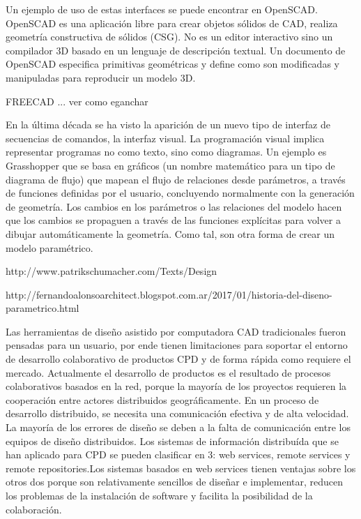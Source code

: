Un ejemplo de uso de estas interfaces se puede encontrar en OpenSCAD. OpenSCAD es una aplicación libre para crear objetos sólidos de CAD, realiza geometría constructiva de sólidos (CSG). No es un editor interactivo sino un compilador 3D basado en un lenguaje de descripción textual. Un documento de OpenSCAD especifica primitivas geométricas y define como son modificadas y manipuladas para reproducir un modelo 3D.

FREECAD ... ver como eganchar


En la última década se ha visto la aparición de un nuevo tipo de interfaz de secuencias de comandos, la interfaz visual. La programación visual implica representar programas no como texto, sino como diagramas. Un ejemplo es Grasshopper que se basa en gráficos (un nombre matemático para un tipo de diagrama de flujo) que mapean el flujo de relaciones desde parámetros, a través de funciones definidas por el usuario, concluyendo normalmente con la generación de geometría. Los cambios en los parámetros o las relaciones del modelo hacen que los cambios se propaguen a través de las funciones explícitas para volver a dibujar automáticamente la geometría. Como tal, son otra forma de crear un modelo paramétrico.

http://www.patrikschumacher.com/Texts/Design%

http://fernandoalonsoarchitect.blogspot.com.ar/2017/01/historia-del-diseno-parametrico.html

Las herramientas de diseño asistido por computadora CAD tradicionales fueron pensadas para un usuario, por ende tienen limitaciones para soportar el entorno de desarrollo colaborativo de productos CPD y de forma rápida como requiere el mercado. Actualmente el desarrollo de productos es el resultado de procesos colaborativos basados en la red, porque la mayoría de los proyectos requieren la cooperación entre actores distribuidos geográficamente. En un proceso de desarrollo distribuido, se necesita una comunicación efectiva y de alta velocidad. La mayoría de los errores de diseño se deben a la falta de comunicación entre los equipos de diseño distribuidos.
Los sistemas de información distribuída que se han aplicado para CPD se pueden clasificar en 3: web services, remote services y remote repositories.Los sistemas basados en web services tienen ventajas sobre los otros dos porque son relativamente sencillos de diseñar e implementar, reducen los problemas de la instalación de software y facilita la posibilidad de la colaboración. \cite{Nyamsuren2015}
